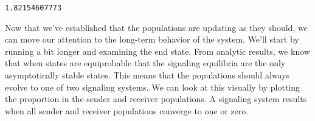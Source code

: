 \documentclass{article}
\begin{document}
    \begin{Verbatim}[commandchars=\\\{\}]
1.82154607773
    \end{Verbatim}

    Now that we've established that the populations are updating as they
should, we can move our attention to the long-term behavior of the
system. We'll start by running a bit longer and examining the end state.
From analytic results, we know that when states are equiprobable that
the signaling equilibria are the only asymptotically stable states. This
means that the populations should always evolve to one of two signaling
systems. We can look at this visually by plotting the proportion in the
sender and receiver populations. A signaling system results when all
sender and receiver populations converge to one or zero.
\end{document}
